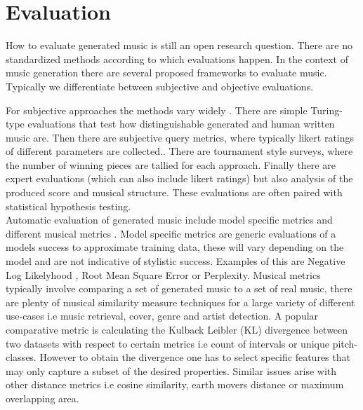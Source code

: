 \section{Evaluation} \label{section:evaluation}
How to evaluate generated music is still an open research question. There are no standardized methods according to which evaluations happen\cite{Yin_Reuben_Stepney_Collins_2023}. In the context of music generation there are several proposed frameworks to evaluate music. Typically we differentiate between subjective and objective evaluations.

For subjective approaches the methods vary widely \cite{Xiong_Wang_ai_eval_methods_2023}. There are simple Turing-type evaluations that test how distinguishable generated and human written music are. Then there are subjective query metrics, where typically likert ratings of different parameters are collected.\cite{Min_Jiang_Xia_Zhao_polyffusion_2023}.
There are tournament style surveys, where the number of winning pieces are tallied for each approach.\cite{Huang_Vaswani_Uszkoreit_Shazeer_Simon_Hawthorne_Dai_Hoffman_Dinculescu_Eck_2018}\cite{Rütte_figaro_2023} Finally there are expert evaluations (which can also include likert ratings) but also analysis of the produced score and musical structure. \cite{Sturm_Ben-Tal_2016} These evaluations are often paired with statistical hypothesis testing. \cite{Rütte_figaro_2023}\\

Automatic evaluation of generated music include model specific metrics and different musical metrics \cite{Xiong_Wang_ai_eval_methods_2023}. Model specific metrics are generic evaluations of a models success to approximate training data, these will vary depending on the model and are not indicative of stylistic success. Examples of this are Negative Log Likelyhood \cite{Huang_Vaswani_Uszkoreit_Shazeer_Simon_Hawthorne_Dai_Hoffman_Dinculescu_Eck_2018}, Root Mean Square Error \cite{Rütte_figaro_2023} or Perplexity\cite{Rütte_figaro_2023}. Musical metrics typically involve comparing a set of generated music to a set of real music, there are plenty of musical similarity measure techniques\cite{Gurjar_Moon_similarity_2018} for a large variety of different use-cases i.e music retrieval, cover, genre and artist detection. A popular comparative metric is calculating the Kulback Leibler (KL) divergence between two datasets with respect to certain metrics i.e count of intervals or unique pitch-classes. However to obtain the divergence one has to select specific features that may only capture a subset of the desired properties. Similar issues arise with other distance metrics i.e cosine similarity, earth movers distance or maximum overlapping area. 

